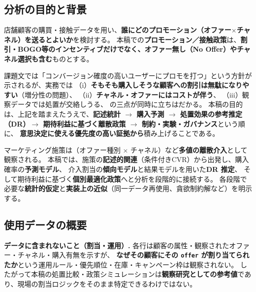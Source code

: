 \documentclass[11pt,a4paper]{article}
\begin{document}
\subsection{分析の目的と背景}
店舗顧客の購買・接触データを用い、\textbf{誰にどのプロモーション（オファー$\times$チャネル）を送るとよいか}を検討する。
本稿での\textbf{プロモーション／接触政策}は、\textbf{割引・BOGO等のインセンティブだけでなく、オファー無し（No Offer）やチャネル選択も含む}ものとする。

課題文では「コンバージョン確度の高いユーザーにプロモを打つ」という方針が示されるが、実務では
（i）\textbf{そもそも購入しそうな顧客への割引は無駄になりやすい}（増分性の問題）、
（ii）\textbf{チャネル・オファーにはコストが伴う}、
（iii）観察データでは処置が交絡しうる、
の三点が同時に立ちはだかる。
本稿の目的は、上記を踏まえたうえで、\textbf{記述統計 $\rightarrow$ 購入予測 $\rightarrow$ 処置効果の参考推定（DR）$\rightarrow$ 期待利益に基づく離散政策 $\rightarrow$ 制約・実験・ガバナンス}という順に、
\textbf{意思決定に使える優先度の高い証拠から}積み上げることである。

マーケティング施策は（オファー種別 $\times$ チャネル）など\textbf{多値の離散介入}として観察される。
本稿では、施策の\textbf{記述的関連}（条件付きCVR）から出発し、購入確率の\textbf{予測モデル}、
介入割当の\textbf{傾向モデル}と結果モデルを用いた\textbf{DR 推定}、
そして期待利益に基づく\textbf{個別最適化政策}へと分析を段階的に接続する。
各段階で必要な\textbf{統計的仮定}と\textbf{実装上の近似}（同一データ再使用、貪欲制約解など）を明示する。

\subsection{使用データの概要}



\noindent\textbf{データに含まれないこと（割当・運用）.}
各行は顧客の属性・観察されたオファー・チャネル・購入有無を示すが、
\textbf{なぜその顧客にその \texttt{offer} が割り当てられたか}という運用ルール・優先順位・在庫・キャンペーン枠は観察されない。
したがって本稿の処置比較・政策シミュレーションは\textbf{観察研究としての参考値}であり、現場の割当ロジックをそのまま特定できるわけではない。
\end{document}
